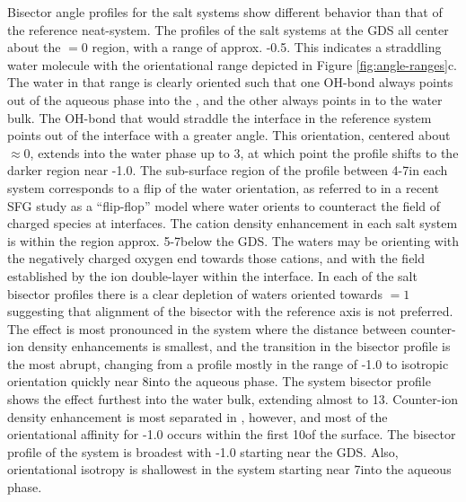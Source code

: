 
Bisector angle profiles for the salt systems show different behavior than that of the reference neat-\ctcwat system. The profiles of the salt systems at the GDS all center about the \costheta$=0$ region, with a range of approx. -0.5. This indicates a straddling water molecule with the orientational range depicted in Figure \ref{fig:angle-ranges}c. The water in that range is clearly oriented such that one OH-bond always points out of the aqueous phase into the \ctc, and the other always points in to the water bulk. The OH-bond that would straddle the interface in the reference system points out of the interface with a greater angle. This orientation, centered about \costheta$\approx 0$, extends into the water phase up to 3\angs, at which point the profile shifts to the darker region near -1.0. The sub-surface region of the profile between 4-7\angs in each system corresponds to a flip of the water orientation, as referred to in a recent SFG study as a ``flip-flop'' model where water orients to counteract the field of charged species at interfaces.\cite{Nihonyanagi2009} The cation density enhancement in each salt system is within the region approx. 5-7\angs below the GDS. The waters may be orienting with the negatively charged oxygen end towards those cations, and with the field established by the ion double-layer within the interface. In each of the salt bisector profiles there is a clear depletion of waters oriented towards \costheta$=1$ suggesting that alignment of the bisector with the reference axis is not preferred. The effect is most pronounced in the \sodsul system where the distance between counter-ion density enhancements is smallest, and the transition in the bisector profile is the most abrupt, changing from a profile mostly in the range of -1.0 to isotropic orientation quickly near 8\angs into the aqueous phase. The \sodnit system bisector profile shows the effect furthest into the water bulk, extending almost to 13\angs. Counter-ion density enhancement is most separated in \sodnit, however, and most of the orientational affinity for -1.0 occurs within the first 10\angs of the surface. The bisector profile of the \nacl system is broadest with -1.0 starting near the GDS. Also, orientational isotropy is shallowest in the \nacl system starting near 7\angs into the aqueous phase.

